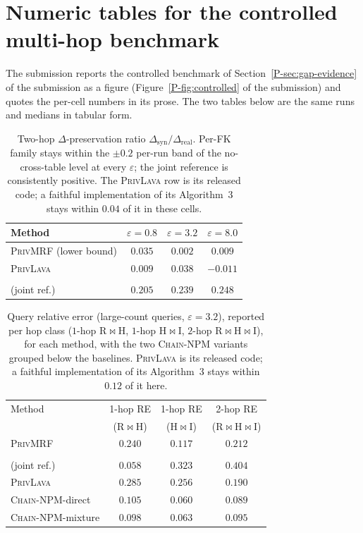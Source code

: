 \documentclass[sigconf, nonacm]{acmart}
\newcommand{\chainnpm}{\textsc{Chain-NPM}\xspace}
\newcommand{\privlava}{\textsc{PrivLava}\xspace}
\newcommand{\privmrf}{\textsc{PrivMRF}\xspace}
\newcommand{\privmrfden}{\privmrf(denorm)\xspace}
\newcommand{\psec}[1]{Section~\ref{P-sec:#1} of the submission}
\newcommand{\pfig}[1]{Figure~\ref{P-fig:#1} of the submission}
\begin{document}
\section{Numeric tables for the controlled multi-hop benchmark}
\label{app:controlled}

The submission reports the controlled benchmark of \psec{gap-evidence} as a
figure (\pfig{controlled}) and quotes the per-cell numbers in its prose.
The two tables below are the same runs and medians in tabular form.

\begin{table}[t]
\centering
\caption{Two-hop $\Delta$-preservation ratio $\Delta_{\mathrm{syn}}/\Delta_{\mathrm{real}}$.
Per-FK family stays within the $\pm 0.2$ per-run band of the no-cross-table
level at every $\varepsilon$; the joint reference is consistently positive.
The \privlava{} row is its released code; a faithful implementation of its
Algorithm~3 stays within $0.04$ of it in these cells.}
\label{tab:gap}
\begin{tabular}{lccc}
\toprule
Method & $\varepsilon{=}0.8$ & $\varepsilon{=}3.2$ & $\varepsilon{=}8.0$ \\
\midrule
\privmrf{} (lower bound) & $0.035$ & $0.002$ & $0.009$ \\
\privlava & $0.009$ & $0.038$ & $-0.011$ \\
\shortstack[l]{\privmrfden{}\\ (joint ref.)} & $\mathbf{0.205}$ & $\mathbf{0.239}$ & $\mathbf{0.248}$ \\
\bottomrule
\end{tabular}
\end{table}

\begin{table}[t]
\centering
\caption{Query relative error (large-count queries, $\varepsilon{=}3.2$),
reported per hop class ($1$-hop R$\Join$H, $1$-hop H$\Join$I, $2$-hop
R$\Join$H$\Join$I), for each method, with the two \chainnpm{} variants grouped
below the baselines. \privlava{} is its released code; a faithful
implementation of its Algorithm~3 stays within $0.12$ of it here.}
\label{tab:re32}
\begin{tabular}{lccc}
\toprule
Method & 1-hop RE & 1-hop RE & 2-hop RE \\
 & (R$\Join$H) & (H$\Join$I) & (R$\Join$H$\Join$I) \\
\midrule
\privmrf & $0.240$ & $0.117$ & $0.212$ \\
\shortstack[l]{\privmrfden{}\\ (joint ref.)} & $\mathbf{0.058}$ & $0.323$ & $0.404$ \\
\privlava & $0.285$ & $0.256$ & $0.190$ \\
\midrule
\chainnpm-direct & $0.105$ & $\mathbf{0.060}$ & $\mathbf{0.089}$ \\
\chainnpm-mixture & $0.098$ & $0.063$ & $0.095$ \\
\bottomrule
\end{tabular}
\end{table}
\end{document}
